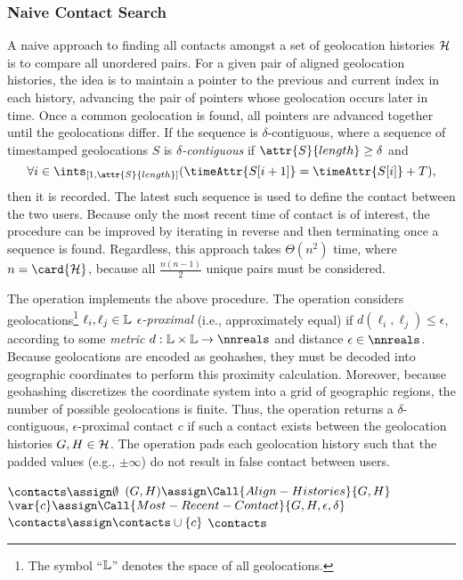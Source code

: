 \subsubsection{Naive Contact Search}
A naive approach to finding all contacts amongst a set of geolocation histories $\mathcal{H}$ is to compare all unordered pairs. For a given pair of aligned geolocation histories, the idea is to maintain a pointer to the previous and current index in each history, advancing the pair of pointers whose geolocation occurs later in time. Once a common geolocation is found, all pointers are advanced together until the geolocations differ. If the sequence is $\delta$\hyp{}contiguous, where a sequence of timestamped geolocations $S$ is \emph{$\delta$\hyp{}contiguous} if $\attr{S}{length} \geq \delta$ and
	\begin{equation*}
		\forall i \in \ints_{[1, \attr{S}{length}]}(\timeAttr{S[i + 1]} = \timeAttr{S[i]} + T),
	\end{equation*}
then it is recorded. The latest such sequence is used to define the contact between the two users. Because only the most recent time of contact is of interest, the procedure can be improved by iterating in reverse and then terminating once a sequence is found. Regardless, this approach takes $\Theta(n^2)$ time, where $n = \card{\histories}$, because all $\frac{n(n - 1)}{2}$ unique pairs must be considered.

The  operation implements the above procedure. The operation  considers geolocations\footnote{The symbol ``$\mathbb{L}$'' denotes the space of all geolocations.} $\ell_i, \ell_j \in \mathbb{L}$ \emph{$\epsilon$\hyp{}proximal} (i.e., approximately equal) if $d(\ell_i, \ell_j) \leq \epsilon$, according to some \emph{metric} $d: \locations \times \locations \rightarrow \nnreals$ \cite[p. 118]{Kelley1975} and distance $\epsilon \in \nnreals$. Because geolocations are encoded as geohashes, they must be decoded into geographic coordinates to perform this proximity calculation. Moreover, because geohashing discretizes the coordinate system into a grid of geographic regions, the number of possible geolocations is finite. Thus, the operation returns a $\delta$\hyp{}contiguous, $\epsilon$\hyp{}proximal contact $c$ if such a contact exists between the geolocation histories $G, H \in \mathcal{H}$. The  operation pads each geolocation history such that the padded values (e.g., $\pm \infty$) do not result in false contact between users.
	\begin{algorithm}[ht!]
	\begin{algorithmic}[1]
		\State $\contacts \assign \emptyset$
			\State $(\hone, \htwo) \assign \Call{Align-Histories}{\hone, \htwo}$
			\State $\var{c} \assign \Call{Most-Recent-Contact}{\hone, \htwo, \epsilon, \delta}$
				\State $\contacts \assign \contacts \cup \{c\}$
			\EndIf
		\EndFor
		\State \Return $\contacts$
	\end{algorithmic}
	\end{algorithm}

